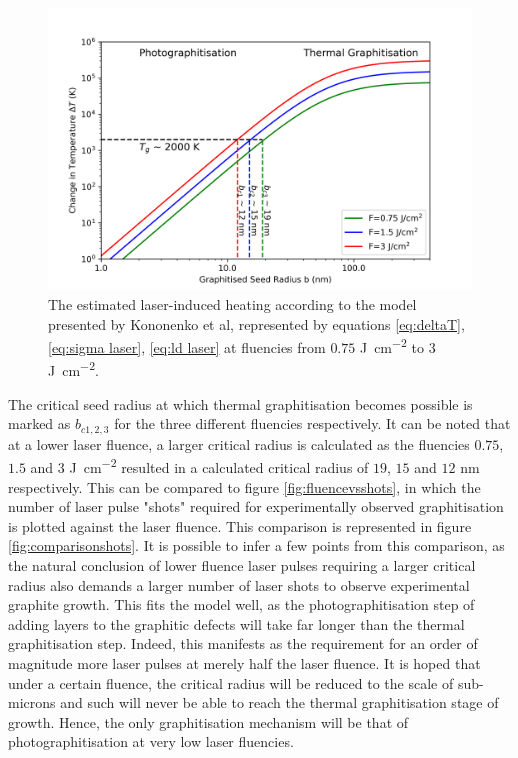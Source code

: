 \begin{refsection}
\begin{figure}
	\centering
	\includegraphics[width=\linewidth]{Chapter2/Figs/Raster/laser heating.png}
	\caption{The estimated laser-induced heating according to the model presented by Kononenko et al, represented by equations \ref{eq:deltaT}, \ref{eq:sigma laser}, \ref{eq:ld laser} at fluencies from $0.75$ \si{\joule\per\centi\metre\squared} to $3$ \si{\joule\per\centi\metre\squared}.}
	\label{fig:laser-heating}
\end{figure}

The critical seed radius at which thermal graphitisation becomes possible is marked as $b_{c1,2,3}$ for the three different fluencies respectively. It can be noted that at a lower laser fluence, a larger critical radius is calculated as the fluencies $0.75$, $1.5$ and $3$ \si{\joule\per\centi\metre\squared} resulted in a calculated critical radius of $19$, $15$ and $12$ \si{\nano\metre} respectively. This can be compared to figure \ref*{fig:fluencevsshots}, in which the number of laser pulse "shots" required for experimentally observed graphitisation is plotted against the laser fluence. This comparison is represented in figure \ref{fig:comparisonshots}. It is possible to infer a few points from this comparison, as the natural conclusion of lower fluence laser pulses requiring a larger critical radius also demands a larger number of laser shots to observe experimental graphite growth. This fits the model well, as the photographitisation step of adding layers to the graphitic defects will take far longer than the thermal graphitisation step. Indeed, this manifests as the requirement for an order of magnitude more laser pulses at merely half the laser fluence. It is hoped that under a certain fluence, the critical radius will be reduced to the scale of sub-microns and such will never be able to reach the thermal graphitisation stage of growth. Hence, the only graphitisation mechanism will be that of photographitisation at very low laser fluencies.


\end{refsection}
